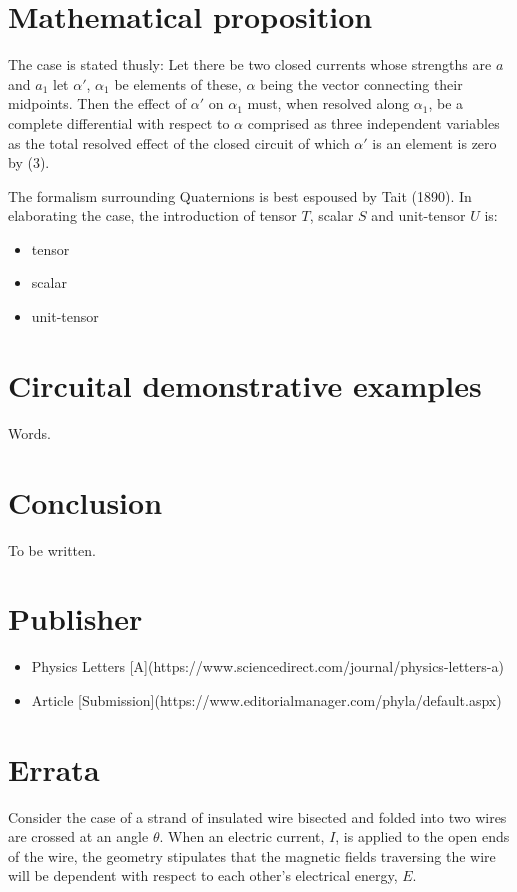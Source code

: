 \documentclass[]{article}
\begin{document}
\section{Mathematical proposition}
The case is stated thusly: Let there be two closed currents whose strengths are $a$ and $a_1$ let $\alpha\prime$, $\alpha_1$ be elements of these, $\alpha$ being the vector connecting their midpoints. Then the effect of $\alpha\prime$ on $\alpha_1$ must, when resolved along $\alpha_1$, be a complete differential with respect to $\alpha$ comprised as three independent variables as the total resolved effect of the closed circuit of which $\alpha\prime$ is an element is zero by (3).

The formalism surrounding Quaternions is best espoused by Tait (1890). In elaborating the case, the introduction of tensor $T$, scalar $S$ and unit-tensor $U$ is:

\begin{itemize}
  \item tensor
  \item scalar
  \item unit-tensor
\end{itemize}



\section{Circuital demonstrative examples}
Words.

\section{Conclusion}
To be written.

\section{Publisher}
\begin{itemize}
  \item  Physics Letters [A](https://www.sciencedirect.com/journal/physics-letters-a)
  \item Article [Submission](https://www.editorialmanager.com/phyla/default.aspx)
\end{itemize}

\section{Errata}
Consider the case of a strand of insulated wire bisected and folded into two wires are crossed at an angle $\theta$. When an electric current, $I$, is applied to the open ends of the wire, the geometry stipulates that the magnetic fields traversing the wire will be dependent with respect to each other's electrical energy, $E$.
\end{document}
